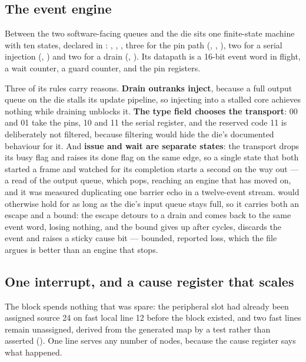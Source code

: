 \subsection{The event engine}

Between the two software-facing queues and the die sits one
finite-state machine with ten states, declared in
: ,
, , three for the pin path
(, , ), two for a
serial injection (, ) and two for a
drain (, ). Its datapath is a 16-bit
event word in flight, a wait counter, a guard counter, and the pin
registers.

Three of its rules carry reasons. \textbf{Drain outranks inject},
because a full output queue on the die stalls its update pipeline, so
injecting into a stalled core achieves nothing while draining unblocks
it. \textbf{The type field chooses the transport}: 00 and 01 take the
pins, 10 and 11 the serial register, and the reserved code 11 is
deliberately not filtered, because filtering would hide the die's
documented behaviour for it. And \textbf{issue and wait are separate
states}: the transport drops its busy flag and raises its done flag on
the same edge, so a single state that both started a frame and watched
for its completion starts a second on the way out --- a read of the
output queue, which pops, reaching an engine that has moved on, and it
was measured duplicating one barrier echo in a twelve-event stream.
 would otherwise hold for as long as the die's input
queue stays full, so it carries both an escape and a bound: the escape
detours to a drain and comes back to the same event word, losing
nothing, and the bound gives up after  cycles,
discards the event and raises a sticky cause bit --- bounded, reported
loss, which the file argues is better than an engine that stops.

\subsection{One interrupt, and a cause register that scales}

The block spends nothing that was spare: the peripheral slot had
already been assigned source 24 on fast local line 12 before the block
existed, and two fast lines remain unassigned, derived from the
generated map by a test rather than asserted ().
One line serves any number of nodes, because the cause register says
what happened.

